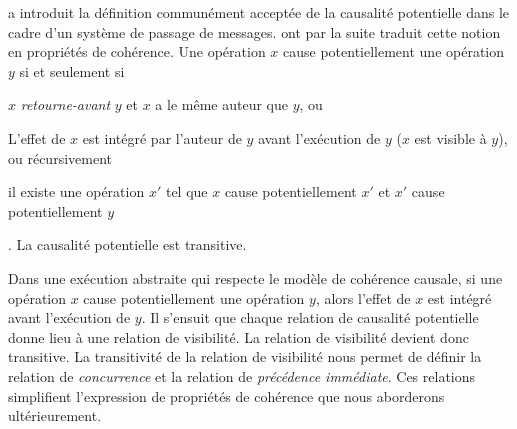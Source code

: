 \textcite{lamport_1978_time} a introduit la définition communément acceptée de la causalité potentielle dans le cadre d'un système de passage de messages.
\textcite{hutto_1990_causal} ont par la suite traduit cette notion en propriétés de cohérence.
Une opération $x$ cause potentiellement une opération $y$ si et seulement si \begin{inlinelist}
    \item $x$ \emph{retourne-avant} $y$ et $x$ a le même auteur que $y$, ou
    \item L'effet de $x$ est intégré par l'auteur de $y$ avant l'exécution de $y$ ($x$ est visible à $y$), ou récursivement
    \item il existe une opération $x'$ tel que $x$ cause potentiellement $x'$ et $x'$ cause potentiellement $y$
\end{inlinelist}.
La causalité potentielle est transitive.

Dans une exécution abstraite qui respecte le modèle de cohérence causale, si une opération $x$ cause potentiellement une opération $y$, alors l'effet de $x$ est intégré avant l'exécution de $y$.
Il s'ensuit que chaque relation de causalité potentielle donne lieu à une relation de visibilité.
La relation de visibilité devient donc transitive.
La transitivité de la relation de visibilité nous permet de définir la relation de \emph{concurrence} et la relation de \emph{précédence immédiate}.
Ces relations simplifient l'expression de propriétés de cohérence que nous aborderons ultérieurement.

